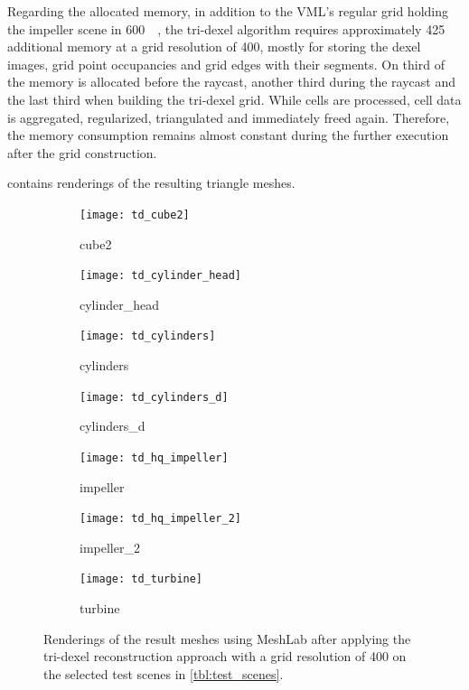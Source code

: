 Regarding the allocated memory, in addition to the VML's regular grid holding the impeller scene in \SI{600}{\mebi\byte}, the tri-dexel algorithm requires approximately \SI{425}{\mebi\byte} additional memory at a grid resolution of 400, mostly for storing the dexel images, grid point occupancies and grid edges with their segments.
On third of the memory is allocated before the raycast, another third during the raycast and the last third when building the tri-dexel grid.
While cells are processed, cell data is aggregated, regularized, triangulated and immediately freed again.
Therefore, the memory consumption remains almost constant during the further execution after the grid construction.

 contains renderings of the resulting triangle meshes.
%
\begin{figure}
	\centering
	\begin{subfigure}[b]{0.34\textwidth}
		\centering
		\texttt{[image: td\_cube2]}
		\caption{cube2}
		\label{fig:td_cube2}
	\end{subfigure}
	\hspace{1cm}
	\begin{subfigure}[b]{0.34\textwidth}
		\centering
		\texttt{[image: td\_cylinder\_head]}
		\caption{cylinder\_head}
		\label{fig:td_cylinder_head}
	\end{subfigure}
	\begin{subfigure}[b]{0.34\textwidth}
		\centering
		\texttt{[image: td\_cylinders]}
		\caption{cylinders}
		\label{fig:td_cylinders}
	\end{subfigure}
	\hspace{1cm}
	\begin{subfigure}[b]{0.34\textwidth}
		\centering
		\texttt{[image: td\_cylinders\_d]}
		\caption{cylinders\_d}
		\label{fig:td_cylinders_delaunay}
	\end{subfigure}
	\begin{subfigure}[b]{0.34\textwidth}
		\centering
		\texttt{[image: td\_hq\_impeller]}
		\caption{impeller}
		\label{fig:td_hq_impeller}
	\end{subfigure}
	\hspace{1cm}
	\begin{subfigure}[b]{0.34\textwidth}
		\centering
		\texttt{[image: td\_hq\_impeller\_2]}
		\caption{impeller\_2}
		\label{fig:td_hq_impeller_2}
	\end{subfigure}
	\begin{subfigure}[b]{0.33\textwidth}
		\centering
		\texttt{[image: td\_turbine]}
		\caption{turbine}
		\label{fig:td_turbine}
	\end{subfigure}
	\caption{
		Renderings of the result meshes using MeshLab after applying the tri-dexel reconstruction approach with a grid resolution of 400 on the selected test scenes in \cref{tbl:test_scenes}.
	}
	\label{fig:td_results}
\end{figure}
